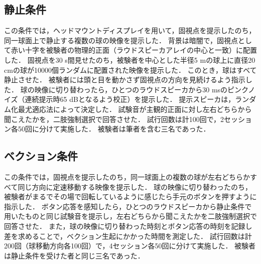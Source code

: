 \documentclass[12pt,a4j]{jsarticle}
\renewcommand{\ }{\hspace{1zw}}
\begin{document}
\raggedright
\subsection{静止条件}
\ この条件では，ヘッドマウントディスプレイを用いて，固視点を提示したのち，同一球面上で静止する複数の球の映像を提示した．
背景は暗闇で，固視点として赤い十字を被験者の物理的正面（ラウドスピーカアレイの中心と一致）に配置した．
固視点を30 s間見せたのち，被験者を中心とした半径5 mの球上に直径20 cmの球が10000個ランダムに配置された映像を提示した．
このとき，球はすべて静止させた．
被験者には頭と目を動かさず固視点の方向を見続けるよう指示した．
球の映像に切り替わったら，ひとつのラウドスピーカから30 msのピンクノイズ（連続提示時65 dBとなるよう校正）を提示した．
提示スピーカは，ランダム化最尤適応法によって決定した．
試験音が主観的正面に対し左右どちらから聞こえたかを，二肢強制選択で回答させた．
試行回数は計100回で，2セッション各50回に分けて実施した．
被験者は筆者を含む三名であった．

\subsection{ベクション条件}
\ この条件では，固視点を提示したのち，同一球面上の複数の球が左右どちらかすべて同じ方向に定速移動する映像を提示した．
球の映像に切り替わったのち，被験者がまるでその場で回転しているように感じたら手元のボタンを押すように指示した．
ボタン応答を感知したら，ひとつのラウドスピーカから静止条件で用いたものと同じ試験音を提示し，左右どちらから聞こえたかを二肢強制選択で回答させた．
また，球の映像に切り替わった時刻とボタン応答の時刻を記録し差を求めることで，ベクション生起にかかった時間を測定した．
試行回数は計200回（球移動方向各100回）で，4セッション各50回に分けて実施した．
被験者は静止条件を受けた者と同じ三名であった．
\end{document}

